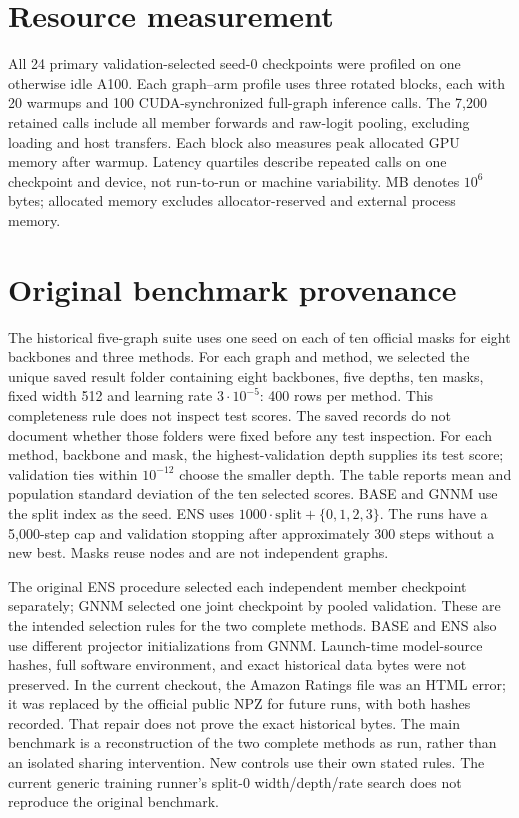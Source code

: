 \section{Resource measurement}\label{app:tuning-resources}
All 24 primary validation-selected seed-0 checkpoints were profiled
on one otherwise idle A100. Each graph--arm profile uses three rotated
blocks, each with 20 warmups and 100 CUDA-synchronized full-graph
inference calls. The 7,200 retained calls include all member forwards
and raw-logit pooling, excluding loading and host transfers. Each
block also measures peak allocated GPU memory after warmup. Latency
quartiles describe repeated calls on one checkpoint and device, not
run-to-run or machine variability. MB denotes $10^6$ bytes; allocated
memory excludes allocator-reserved and external process memory.

\section{Original benchmark provenance}\label{app:protocol}
The historical five-graph suite uses one seed on each of ten official
masks for eight backbones and three methods. For each graph and method,
we selected the unique saved result folder containing eight backbones,
five depths, ten masks, fixed width 512 and learning rate
$3\cdot10^{-5}$: 400 rows per method. This completeness rule does not
inspect test scores. The saved records do not document whether those
folders were fixed before any test inspection. For each method,
backbone and mask, the highest-validation depth supplies its test
score; validation ties within $10^{-12}$ choose the smaller depth.
The table reports mean and population standard deviation of the ten
selected scores. BASE and GNNM use the split index as the seed. ENS uses
$1000\cdot\mathrm{split}+\{0,1,2,3\}$. The runs have a 5,000-step cap
and validation stopping after approximately 300 steps without a new best.
Masks reuse nodes and are not independent graphs.

The original ENS procedure selected each independent member checkpoint
separately; GNNM selected one joint checkpoint by pooled validation.
These are the intended selection rules for the two complete methods.
BASE and ENS also use different projector initializations from GNNM.
Launch-time model-source hashes,
full software environment, and exact historical data bytes were not
preserved. In the current checkout, the Amazon Ratings file was an
HTML error; it was replaced by the official public NPZ for future
runs, with both hashes recorded. That repair does not prove the exact
historical bytes. The main benchmark is a reconstruction of the two
complete methods as run, rather than an isolated sharing intervention.
New controls use
their own stated rules. The current generic training runner's split-0
width/depth/rate search does not reproduce the original benchmark.

